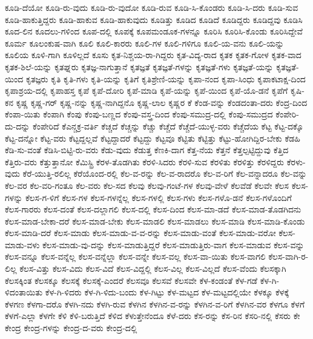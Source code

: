{ಕೂಡಿ-ದೆಯೋ
ಕೂಡಿ-ರು-ವುದು
ಕೂಡಿ-ರು-ವುದೋ
ಕೂಡಿ-ರುವ
ಕೂಡಿ-ಸಿ-ಕೊಂಡರು
ಕೂಡಿ-ಸಿ-ದರು
ಕೂಡಿ-ಸುವ
ಕೂಡಿ-ಹಾಕುತ್ತಿದ್ದರು
ಕೂಡಿ-ಹಾಕುವ
ಕೂಡಿ-ಹಾಕುವುದು
ಕೂಡಿತ್ತು
ಕೂಡಿದ
ಕೂಡಿದೆ
ಕೂಡಿದ್ದರು
ಕೂಡಿದ್ದವು
ಕೂಡಿಸಿ
ಕೂದ-ಲಿನ
ಕೂದಲು-ಗಳಿಂದ
ಕೂಪ-ದಲ್ಲಿ
ಕೂಪಕ್ಕೆ
ಕೂಪಮಂಡೂಕ-ಗಳನ್ನೂ
ಕೂರಿಸಿ
ಕೂರಿಸಿ-ಕೊಂಡು
ಕೂರಿಸಿದ್ದೇವೆ
ಕೂರ್ಮ
ಕೂಲಂಕುಷ-ವಾಗಿ
ಕೂಲಿ
ಕೂಲಿ-ಕಾರರು
ಕೂಲಿ-ಗಳ
ಕೂಲಿ-ಗಳಿಗೂ
ಕೂಲಿ-ಯ-ವನು
ಕೂಲಿ-ಯನ್ನು
ಕೂಲಿಯ
ಕೂಳಿ-ಗಾಗಿ
ಕೂಳಿಲ್ಲದೆ
ಕೂಸು
ಕೃತ-ನಿಶ್ಚಯ-ರಾ-ಗಿದ್ದರು
ಕೃತ-ವಿದ್ಯ-ರಾದ
ಕೃತಕ
ಕೃತಕ-ಗೋಳ
ಕೃತಕ-ವಾದ
ಕೃತಕ-ಶಿಲೆ-ಯನ್ನು
ಕೃತಘ್ನರು
ಕೃತಜ್ಞ-ನಾಗುತ್ತಾನೆ
ಕೃತಜ್ಞತೆ
ಕೃತಜ್ಞತೆ-ಗಳನ್ನು
ಕೃತಜ್ಞತೆ-ಗಳು
ಕೃತಜ್ಞತೆ-ಯನ್ನು
ಕೃತಜ್ಞತೆ-ಯಿಂದ
ಕೃತಜ್ಞರು
ಕೃತಿ
ಕೃತಿ-ಗಳು
ಕೃತಿ-ಯನ್ನು
ಕೃತಿಗೆ
ಕೃತಿಶ್ರೇಣಿ-ಯನ್ನು
ಕೃಪಾ-ನಂದ
ಕೃಪಾ-ಸಿಂಧು
ಕೃಪಾಕಟಾಕ್ಷ-ದಿಂದ
ಕೃಪಾಶ್ರಯ-ದಲ್ಲಿ
ಕೃಪಾಹಸ್ತ
ಕೃಪೆ
ಕೃಪೆ-ದೋರಿ
ಕೃಪೆ-ಮಾಡಿ
ಕೃಪೆ-ಯನ್ನು
ಕೃಪೆ-ಯಿಂದ
ಕೃಪೆ-ಯೊ-ಡನೆ
ಕೃಪೆಗೆ
ಕೃಷಿ-ಕನ
ಕೃಷ್ಣ
ಕೃಷ್ಣ-ಗರ್
ಕೃಷ್ಣ-ನನ್ನು
ಕೃಷ್ಣ-ನಾಗಿದ್ದನೊ
ಕೃಷ್ಣ-ಲಾಲ
ಕೃಷ್ಣರ
ಕೆ
ಕೆಂಡ-ವನ್ನು
ಕೆಂಡದಂತಾ-ದರು
ಕೆಂದ್ರ-ದಿಂದ
ಕೆಂಪಾ-ಯಿತು
ಕೆಂಪಾಗಿ
ಕೆಂಪು
ಕೆಂಪು-ಬಣ್ಣದ
ಕೆಂಪು-ವಸ್ತ್ರ-ದಿಂದ
ಕೆಂಪು-ಸಮುದ್ರ-ದಲ್ಲಿ
ಕೆಂಪು-ಸಮುದ್ರದ
ಕೆಂಪೇರಿ-ದು-ದನ್ನು
ಕೆಂಪೇರಿದೆ
ಕೆಎನ್ಚಕ್ರ-ವರ್ತಿ
ಕೆಚ್ಚದೆ
ಕೆಚ್ಚನ್ನು
ಕೆಚ್ಚು
ಕೆಚ್ಚೆದೆ
ಕೆಚ್ಚೆದೆ-ಯುಳ್ಳ-ವರು
ಕೆಚ್ಚೆದೆಯ
ಕೆಟ್ಟ
ಕೆಟ್ಟ-ದಕ್ಕೊ
ಕೆಟ್ಟ-ದನ್ನೋ
ಕೆಟ್ಟ-ವರು
ಕೆಟ್ಟದ್ದಲ್ಲವೆ
ಕೆಟ್ಟದ್ದಾದರೆ
ಕೆಟ್ಟದ್ದು
ಕೆಟ್ಟವೂ
ಕೆಟ್ಟಿತು
ಕೆಟ್ಟಿತ್ತು
ಕೆಟ್ಟು-ಹೋಗಿದ್ದಿರ-ಬೇಕು
ಕೆಡಹಿ
ಕೆಡಿ-ಸು-ವಂತೆ
ಕೆಡಿಸಿ-ಬಿಟ್ಟಿ-ರು-ವರು
ಕೆಡು-ವುದು
ಕೆಡುತ್ತ
ಕೆಣಕಿ-ದಾಗ
ಕೆತ್ತ-ನೆಯ
ಕೆತ್ತನೆ
ಕೆತ್ತಲ್ಪಟ್ಟಿದ್ದುವು
ಕೆತ್ತಿದ
ಕೆತ್ತಿರು-ವರು
ಕೆತ್ತುತ್ತಾನೋ
ಕೆಮಿಸ್ಟ್ರಿ
ಕೆರಳ-ತೊಡಗಿತು
ಕೆರಳಿ-ಸಿದರು
ಕೆರಳಿ-ಸುವ
ಕೆರಳಿತು
ಕೆರಳಿತ್ತು
ಕೆರಳಿದ್ದರು
ಕೆರಳು-ವುದು
ಕೆರೆ-ಯುತ್ತಿ-ರಲಿಲ್ಲ
ಕೆರೆಯೊಂದ-ರಲ್ಲಿ
ಕೆಲ-ವ-ರನ್ನು
ಕೆಲ-ವ-ರಾದರೊ
ಕೆಲ-ವ-ರಿಗೆ
ಕೆಲ-ವನ್ನಾದರೂ
ಕೆಲ-ವನ್ನು
ಕೆಲ-ವರ
ಕೆಲ-ವರಿ-ಗಂತೂ
ಕೆಲ-ವರು
ಕೆಲ-ಸದ
ಕೆಲವು
ಕೆಲವು-ಗಂಟೆ-ಗಳ
ಕೆಲವು-ವೇಳೆ
ಕೆಲವೆಡೆ
ಕೆಲವೇ
ಕೆಲಸ
ಕೆಲಸ-ಗಳನ್ನು
ಕೆಲಸ-ಗ-ಳಿಗೆ
ಕೆಲಸ-ಗಳ
ಕೆಲಸ-ಗಳನ್ನೆಲ್ಲ
ಕೆಲಸ-ಗಳಲ್ಲಿ
ಕೆಲಸ-ಗಳು
ಕೆಲಸ-ಗಳೊ-ಡನೆ
ಕೆಲಸ-ಗಳೊಂದಿಗೆ
ಕೆಲಸ-ಗಾರರು
ಕೆಲಸ-ದಂತೆ
ಕೆಲಸ-ದಲ್ಲಾಗಲಿ
ಕೆಲಸ-ದಲ್ಲಿ
ಕೆಲಸ-ದಿಂದ
ಕೆಲಸ-ಮಾ-ಡದೆ
ಕೆಲಸ-ಮಾಡ-ತೊಡಗಿದನು
ಕೆಲಸ-ಮಾಡ-ಬೇಕಾ-ದರೆ
ಕೆಲಸ-ಮಾಡ-ಬೇಕು
ಕೆಲಸ-ಮಾಡಲಿ
ಕೆಲಸ-ಮಾಡಲು
ಕೆಲಸ-ಮಾಡಿ
ಕೆಲಸ-ಮಾಡಿ-ಕೊಂಡು
ಕೆಲಸ-ಮಾಡಿ-ದರೆ
ಕೆಲಸ-ಮಾಡು
ಕೆಲಸ-ಮಾಡು-ವ-ವ-ರನ್ನು
ಕೆಲಸ-ಮಾಡು-ವಂತೆ
ಕೆಲಸ-ಮಾಡು-ವರೋ
ಕೆಲಸ-ಮಾಡು-ವಳು
ಕೆಲಸ-ಮಾಡು-ವು-ದನ್ನು
ಕೆಲಸ-ಮಾಡುತ್ತಿದ್ದರೆ
ಕೆಲಸ-ಮಾಡುತ್ತಿರು-ವಾಗ
ಕೆಲಸ-ಮಾಡುವ
ಕೆಲಸ-ವನ್ನು
ಕೆಲಸ-ವನ್ನೂ
ಕೆಲಸ-ವನ್ನೆಲ್ಲ
ಕೆಲಸ-ವನ್ನೆಲ್ಲಾ
ಕೆಲಸ-ವನ್ನೇ
ಕೆಲಸ-ವಲ್ಲ
ಕೆಲಸ-ವಾ-ಯಿತು
ಕೆಲಸ-ವಾಗಲಿ
ಕೆಲಸ-ವಾಗಿ-ರ-ಲಿಲ್ಲ
ಕೆಲಸ-ವಿತ್ತು
ಕೆಲಸ-ವಿದು
ಕೆಲಸ-ವಿದೆ
ಕೆಲಸ-ವಿದ್ದಲ್ಲಿ
ಕೆಲಸ-ವಿಲ್ಲ
ಕೆಲಸ-ವಿಲ್ಲದೆ
ಕೆಲಸ-ವೆಂದು
ಕೆಲಸಕ್ಕಾಗಿ
ಕೆಲಸಕ್ಕಿಂತ
ಕೆಲಸಕ್ಕೂ
ಕೆಲಸಕ್ಕೆ
ಕೆಲಸಕ್ಕೆ-ಎಂದರೆ
ಕೆಲಸವೂ
ಕೆಲಸವೆ
ಕೆಲಸವೇ
ಕೆಳ-ಕಂಡಂತೆ
ಕೆಳ-ಗಡೆ
ಕೆಳ-ಗಿ-ಳಿದಂತಾಯಿತು
ಕೆಳ-ಗಿ-ಳಿದರು
ಕೆಳ-ಗಿ-ಳಿದು-ಬಂದು
ಕೆಳ-ಗಿಟ್ಟು
ಕೆಳ-ಮಟ್ಟದ
ಕೆಳ-ಮಟ್ಟದಲ್ಲಿಯೇ
ಕೆಳಕ್ಕೂ
ಕೆಳಕ್ಕೆ
ಕೆಳಗಣ
ಕೆಳಗಾ-ದರೊ
ಕೆಳಗಿ-ನದು
ಕೆಳಗಿ-ರುವ
ಕೆಳಗಿನ
ಕೆಳಗಿನ-ವ-ರನ್ನು
ಕೆಳಗಿನ-ವ-ರಿಗೆ
ಕೆಳಗಿನ-ವರ
ಕೆಳಗೂ
ಕೆಳಗೆ
ಕೆಳಗೆ-ಎಲ್ಲಾ
ಕೆಳಗೇ
ಕೆಳಿ
ಕೆಳಿ-ಬರುತ್ತಿದೆ
ಕೆಳಿದ
ಕೆಳುತ್ತೇನೆಂದೂ
ಕೆಳೆ-ದರು
ಕೆಸ-ರನ್ನು
ಕೆಸ-ರಿನ
ಕೆಸರಿ-ನಲ್ಲಿ
ಕೆಸರು
ಕೇ
ಕೇಂದ್ರ
ಕೇಂದ್ರ-ಗಳನ್ನು
ಕೇಂದ್ರ-ದ-ವರು
ಕೇಂದ್ರ-ದಲ್ಲಿ
}
